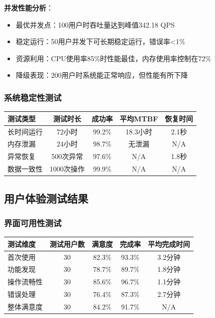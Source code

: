 \documentclass[12pt,a4paper]{article}
\begin{document}
\textbf{并发性能分析}：
\begin{itemize}
    \item 最优并发点：100用户时吞吐量达到峰值342.18 QPS
    \item 稳定运行：50用户并发下可长期稳定运行，错误率<1\%
    \item 资源利用：CPU使用率85\%时性能最佳，内存使用率控制在72\%
    \item 降级表现：200用户时系统能正常响应，但性能有所下降
\end{itemize}

\subsubsection{系统稳定性测试}
\begin{center}
\begin{tabular}{|l|c|c|c|c|}
\hline
\textbf{测试类型} & \textbf{测试时长} & \textbf{成功率} & \textbf{平均MTBF} & \textbf{恢复时间} \\
\hline
长时间运行 & 72小时 & 99.2\% & 18.3小时 & 2.1秒 \\
内存泄漏 & 24小时 & 98.7\% & 无泄漏 & N/A \\
异常恢复 & 500次异常 & 97.6\% & N/A & 1.8秒 \\
数据一致性 & 1000次操作 & 99.9\% & N/A & N/A \\
\hline
\end{tabular}
\end{center}

\subsection{用户体验测试结果}
\subsubsection{界面可用性测试}
\begin{center}
\begin{tabular}{|l|c|c|c|c|}
\hline
\textbf{测试维度} & \textbf{测试用户数} & \textbf{满意度} & \textbf{完成率} & \textbf{平均完成时间} \\
\hline
首次使用 & 30 & 82.3\% & 93.3\% & 3.2分钟 \\
功能发现 & 30 & 78.7\% & 89.7\% & 1.8分钟 \\
操作流畅性 & 30 & 85.6\% & 96.7\% & 1.1分钟 \\
错误处理 & 30 & 76.4\% & 87.3\% & 2.7分钟 \\
整体满意度 & 30 & 84.2\% & 91.7\% & N/A \\
\hline
\end{tabular}
\end{center}
\end{document}
